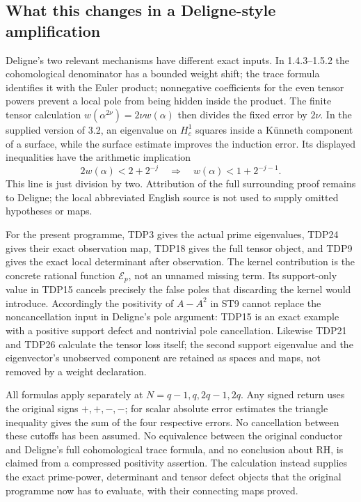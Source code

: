 \subsection{What this changes in a Deligne-style amplification}

Deligne's two relevant mechanisms have different exact inputs. In
1.4.3--1.5.2 the cohomological denominator has a bounded weight shift;
the trace formula identifies it with the Euler product; nonnegative
coefficients for the even tensor powers prevent a local pole from
being hidden inside the product. The finite tensor calculation
$w(\alpha^{2\nu})=2\nu w(\alpha)$ then divides the fixed error by
$2\nu$. In the supplied version of 3.2, an eigenvalue on $H^1_c$
squares inside a K\"unneth component of a surface, while the surface
estimate improves the induction error. Its displayed inequalities have
the arithmetic implication
\begin{equation}\tag{TDP27}
2w(\alpha)<2+2^{-j}\quad\Longrightarrow\quad
w(\alpha)<1+2^{-j-1}.
\end{equation}
This line is just division by two. Attribution of the full surrounding
proof remains to Deligne; the local abbreviated English source is not
used to supply omitted hypotheses or maps.

For the present programme, TDP3 gives the actual prime eigenvalues,
TDP24 gives their exact observation map, TDP18 gives the full tensor
object, and TDP9 gives the exact local determinant after observation.
The kernel contribution is the concrete rational function
$\mathcal E_p$, not an unnamed missing term. Its support-only value in
TDP15 cancels precisely the false poles that discarding the kernel
would introduce. Accordingly the positivity of $A-A^2$ in ST9 cannot
replace the noncancellation input in Deligne's pole argument: TDP15 is
an exact example with a positive support defect and nontrivial pole
cancellation. Likewise TDP21 and TDP26 calculate the tensor loss itself;
the second support eigenvalue and the eigenvector's unobserved component
are retained as spaces and maps, not removed by a weight declaration.

All formulas apply separately at $N=q-1,q,2q-1,2q$. Any signed return
uses the original signs $+,+,-,-$; for scalar absolute error estimates
the triangle inequality gives the sum of the four respective errors.
No cancellation between these cutoffs has been assumed. No equivalence
between the original conductor and Deligne's full cohomological trace
formula, and no conclusion about RH, is claimed from a compressed
positivity assertion. The calculation instead supplies the exact
prime-power, determinant and tensor defect objects that the original
programme now has to evaluate, with their connecting maps proved.

